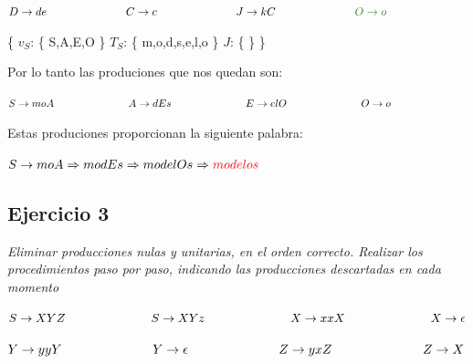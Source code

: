 $ \textcolor{black}{ D \rightarrow de } \hspace{2.5cm} \textcolor{black}{ C \rightarrow c} \hspace{2.5cm} \textcolor{black}{ J \rightarrow  kC } \hspace{2.5cm} \textcolor{OliveGreen}{ O \rightarrow o } \hspace{2.5cm} $ \newline 

\{ $ v_{S} $: \{ S,A,E,O \} \hspace{0.9cm} $ T_{S} $: \{ m,o,d,s,e,l,o \}  \hspace{0.9cm} $ J $: \{  \} \} \newline \newline

Por lo tanto las produciones que nos quedan son: \newline

$ \textcolor{black}{ S \rightarrow moA }  \hspace{2.5cm} \textcolor{black}{ A \rightarrow  dEs } \hspace{2.5cm} \textcolor{black}{ E \rightarrow  elO } \hspace{2.5cm} \textcolor{black}{ O \rightarrow o } \hspace{2.5cm} $ \newline 

Estas produciones proporcionan la siguiente palabra: \newline

$ S \rightarrow moA \Rightarrow modEs \Rightarrow modelOs \Rightarrow \textcolor{red}{modelos} $

\subsection{Ejercicio 3}

\textit{Eliminar producciones  nulas y unitarias, en el orden correcto. Realizar los procedimientos paso por paso, indicando las producciones descartadas en cada momento} \newline

$ S \rightarrow XYZ \hspace{2.5cm} S \rightarrow XYz \hspace{2.5cm} X \rightarrow  xxX \hspace{2.5cm} X \rightarrow  \epsilon $ \newline

$ Y \rightarrow yyY \hspace{2.5cm} Y \rightarrow \epsilon \hspace{2.5cm} Z \rightarrow  yxZ \hspace{2.5cm} Z \rightarrow  X $ \newline

